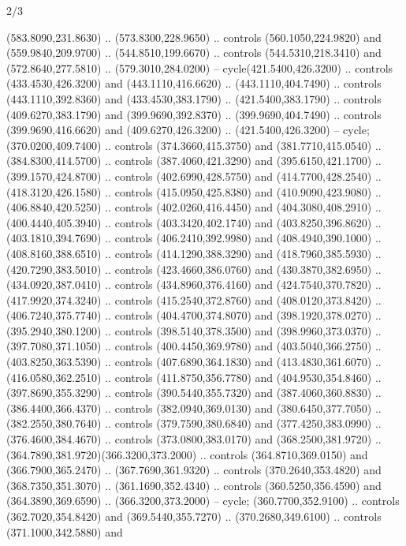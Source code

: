 \begin{flagdescription}{2/3}
\begin{scope}[xshift=0.5\flaglength,yshift=0.5\flagwidth,scale=\flagwidth/255]
\begin{scope}[y=-0.43pt, x=0.43pt,xshift=-193pt,yshift=133pt]
\begin{scope}[draw=black,line width=0.003\flagwidth]
\begin{scope}[fill=white]
  (583.8090,231.8630) .. (573.8300,228.9650) .. controls (560.1050,224.9820) and
  (559.9840,209.9700) .. (544.8510,199.6670) .. controls (544.5310,218.3410) and
  (572.8640,277.5810) .. (579.3010,284.0200) -- cycle(421.5400,426.3200) ..
  controls (433.4530,426.3200) and (443.1110,416.6620) .. (443.1110,404.7490) ..
  controls (443.1110,392.8360) and (433.4530,383.1790) .. (421.5400,383.1790) ..
  controls (409.6270,383.1790) and (399.9690,392.8370) .. (399.9690,404.7490) ..
  controls (399.9690,416.6620) and (409.6270,426.3200) .. (421.5400,426.3200) --
  cycle;
 (370.0200,409.7400) .. controls (374.3660,415.3750) and
  (381.7710,415.0540) .. (384.8300,414.5700) .. controls (387.4060,421.3290) and
  (395.6150,421.1700) .. (399.1570,424.8700) .. controls (402.6990,428.5750) and
  (414.7700,428.2540) .. (418.3120,426.1580) .. controls (415.0950,425.8380) and
  (410.9090,423.9080) .. (406.8840,420.5250) .. controls (402.0260,416.4450) and
  (404.3080,408.2910) .. (400.4440,405.3940) .. controls (403.3420,402.1740) and
  (403.8250,396.8620) .. (403.1810,394.7690) .. controls (406.2410,392.9980) and
  (408.4940,390.1000) .. (408.8160,388.6510) .. controls (414.1290,388.3290) and
  (418.7960,385.5930) .. (420.7290,383.5010) .. controls (423.4660,386.0760) and
  (430.3870,382.6950) .. (434.0920,387.0410) .. controls (434.8960,376.4160) and
  (424.7540,370.7820) .. (417.9920,374.3240) .. controls (415.2540,372.8760) and
  (408.0120,373.8420) .. (406.7240,375.7740) .. controls (404.4700,374.8070) and
  (398.1920,378.0270) .. (395.2940,380.1200) .. controls (398.5140,378.3500) and
  (398.9960,373.0370) .. (397.7080,371.1050) .. controls (400.4450,369.9780) and
  (403.5040,366.2750) .. (403.8250,363.5390) .. controls (407.6890,364.1830) and
  (413.4830,361.6070) .. (416.0580,362.2510) .. controls (411.8750,356.7780) and
  (404.9530,354.8460) .. (397.8690,355.3290) .. controls (390.5440,355.7320) and
  (387.4060,360.8830) .. (386.4400,366.4370) .. controls (382.0940,369.0130) and
  (380.6450,377.7050) .. (382.2550,380.7640) .. controls (379.7590,380.6840) and
  (377.4250,383.0990) .. (376.4600,384.4670) .. controls (373.0800,383.0170) and
  (368.2500,381.9720) .. (364.7890,381.9720)(366.3200,373.2000) .. controls
  (364.8710,369.0150) and (366.7900,365.2470) .. (367.7690,361.9320) .. controls
  (370.2640,353.4820) and (368.7350,351.3070) .. (361.1690,352.4340) .. controls
  (360.5250,356.4590) and (364.3890,369.6590) .. (366.3200,373.2000) -- cycle;
 (360.7700,352.9100) .. controls (362.7020,354.8420) and
  (369.5440,355.7270) .. (370.2680,349.6100) .. controls (371.1000,342.5880) and

\end{scope}
\end{scope}
\end{scope}
\end{scope}
\end{flagdescription}
